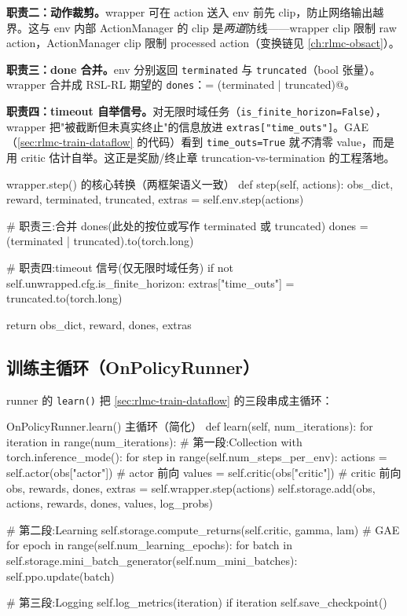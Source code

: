 \textbf{职责二：动作裁剪。}wrapper 可在 action 送入 env 前先 clip，防止网络输出越界。这与 env 内部 ActionManager 的 clip 是\emph{两道}防线——wrapper clip 限制 raw action，ActionManager clip 限制 processed action（变换链见 \cref{ch:rlmc-obsact}）。

\textbf{职责三：done 合并。}env 分别返回 \verb|terminated| 与 \verb|truncated|（bool 张量）。wrapper 合并成 RSL-RL 期望的 \verb|dones|：\verb@dones = (terminated | truncated)@。

\textbf{职责四：timeout 自举信号。}对无限时域任务（\verb|is_finite_horizon=False|），wrapper 把"被截断但未真实终止"的信息放进 \verb|extras["time_outs"]|。GAE（\cref{sec:rlmc-train-dataflow} 的代码）看到 \verb|time_outs=True| 就\emph{不}清零 value，而是用 critic 估计自举。这正是奖励/终止章 truncation-vs-termination 的工程落地。

\begin{codebox}[Python]{wrapper.step() 的核心转换（两框架语义一致）}
def step(self, actions):
    obs_dict, reward, terminated, truncated, extras = self.env.step(actions)

    # 职责三:合并 dones(此处的按位或写作 terminated 或 truncated)
    dones = (terminated | truncated).to(torch.long)

    # 职责四:timeout 信号(仅无限时域任务)
    if not self.unwrapped.cfg.is_finite_horizon:
        extras["time_outs"] = truncated.to(torch.long)

    return obs_dict, reward, dones, extras
\end{codebox}

\subsection{训练主循环（OnPolicyRunner）}

runner 的 \verb|learn()| 把 \cref{sec:rlmc-train-dataflow} 的三段串成主循环：

\begin{codebox}[Python]{OnPolicyRunner.learn() 主循环（简化）}
def learn(self, num_iterations):
    for iteration in range(num_iterations):
        # 第一段:Collection
        with torch.inference_mode():
            for step in range(self.num_steps_per_env):
                actions = self.actor(obs["actor"])      # actor 前向
                values  = self.critic(obs["critic"])    # critic 前向
                obs, rewards, dones, extras = self.wrapper.step(actions)
                self.storage.add(obs, actions, rewards, dones, values, log_probs)

        # 第二段:Learning
        self.storage.compute_returns(self.critic, gamma, lam)   # GAE
        for epoch in range(self.num_learning_epochs):
            for batch in self.storage.mini_batch_generator(self.num_mini_batches):
                self.ppo.update(batch)

        # 第三段:Logging
        self.log_metrics(iteration)
        if iteration %
            self.save_checkpoint()
\end{codebox}

